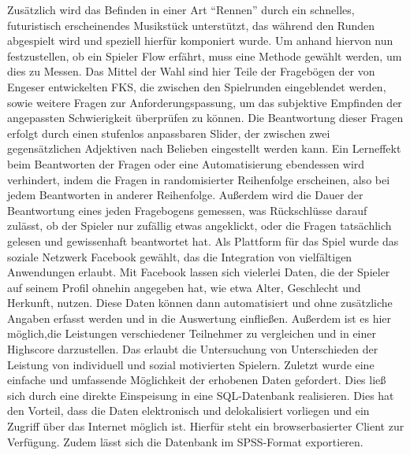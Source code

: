 \documentclass[a4paper,12pt]{scrartcl}
\begin{document}
Zusätzlich wird das Befinden in einer Art "`Rennen"' durch ein schnelles, futuristisch
erscheinendes Musikstück unterstützt, das während den Runden abgespielt wird und
speziell hierfür komponiert wurde.
Um anhand hiervon nun festzustellen, ob ein Spieler Flow erfährt, muss eine Methode
gewählt werden, um dies zu Messen.
Das Mittel der Wahl sind hier Teile der Fragebögen der von Engeser entwickelten
FKS, die zwischen den Spielrunden eingeblendet werden, sowie weitere Fragen zur
Anforderungspassung, um das subjektive Empfinden der angepassten Schwierigkeit
überprüfen zu können. Die Beantwortung dieser Fragen erfolgt durch einen stufenlos
anpassbaren Slider, der zwischen zwei gegensätzlichen Adjektiven nach Belieben
eingestellt werden kann. Ein Lerneffekt beim Beantworten der Fragen oder eine
Automatisierung ebendessen wird verhindert, indem die Fragen in randomisierter
Reihenfolge erscheinen, also bei jedem Beantworten in anderer Reihenfolge. Außerdem
wird die Dauer der Beantwortung eines jeden Fragebogens gemessen, was Rückschlüsse
darauf zulässt, ob der Spieler nur zufällig etwas angeklickt, oder die Fragen tatsächlich
gelesen und gewissenhaft beantwortet hat.
Als Plattform für das Spiel wurde das soziale Netzwerk Facebook gewählt, das die
Integration von vielfältigen Anwendungen erlaubt. Mit Facebook lassen sich vielerlei Daten,
die der Spieler auf seinem Profil ohnehin angegeben hat, wie etwa Alter, Geschlecht und
Herkunft, nutzen. Diese Daten können dann automatisiert und ohne zusätzliche Angaben
erfasst werden und in die Auswertung einfließen.
Außerdem ist es hier möglich,die Leistungen verschiedener Teilnehmer zu vergleichen
und in einer Highscore darzustellen. Das erlaubt die Untersuchung von Unterschieden der
Leistung von individuell und sozial motivierten Spielern.
Zuletzt wurde eine einfache und umfassende Möglichkeit der erhobenen Daten gefordert.
Dies ließ sich durch eine direkte Einspeisung in eine SQL-Datenbank realisieren. Dies hat
den Vorteil, dass die Daten elektronisch und delokalisiert vorliegen und ein Zugriff über das
Internet möglich ist. Hierfür steht ein browserbasierter Client zur Verfügung. Zudem lässt
sich die Datenbank im SPSS-Format exportieren.
\end{document}
